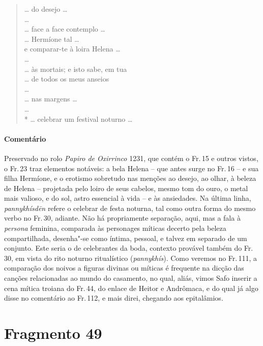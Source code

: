 \begin{verse}
\ldots{} do desejo \ldots{}\\
\ldots{}\\
\ldots{} face a face contemplo \ldots{}\\
\ldots{} Hermíone tal \ldots{}\\
e comparar-te à loira Helena \ldots{}\\
\ldots{}\\
\ldots{} às mortais; e isto sabe, em tua\\
\ldots{} de todos os meus anseios\\
\ldots{}\\
\ldots{} nas margens \ldots{}\\
\ldots{}\\*
\ldots{} celebrar um festival noturno \ldots{} 
\end{verse}

\pagebreak

{\paragraph{Comentário} Preservado no rolo \textit{Papiro de Oxirrinco} 1231, que contém o Fr.\,15 e outros vistos, o Fr.\,23 traz elementos notáveis: a bela Helena -- que antes surge no Fr.\,16 -- e sua filha Hermíone, e o erotismo sobretudo nas menções ao desejo, ao olhar, à beleza de Helena -- projetada pelo loiro de seus cabelos, mesmo tom do ouro, o metal mais valioso, e do sol, astro essencial à vida -- e às ansiedades. Na última linha, \textit{pannykhísdēn} refere o celebrar de festa noturna, tal como outra forma do mesmo verbo no Fr.\,30, adiante. Não há propriamente separação, aqui, mas a fala à \textit{persona} feminina, comparada às personages míticas decerto pela beleza compartilhada, desenha"-se como íntima, pessoal, e talvez em separado de um conjunto. Este seria o de celebrantes da boda, contexto provável também do Fr.\,30, em vista do rito noturno ritualístico (\textit{pannykhís}). Como veremos no Fr.\,111, a comparação dos noivos a figuras divinas ou míticas é frequente na dicção das canções relacionadas ao mundo do casamento, no qual, aliás, vimos Safo inserir a cena mítica troiana do Fr.\,44, do enlace de Heitor e Andrômaca, e do qual já algo disse no comentário ao Fr.\,112, e mais direi, chegando aos epitalâmios.}

\pagebreak
\section{Fragmento 49}

